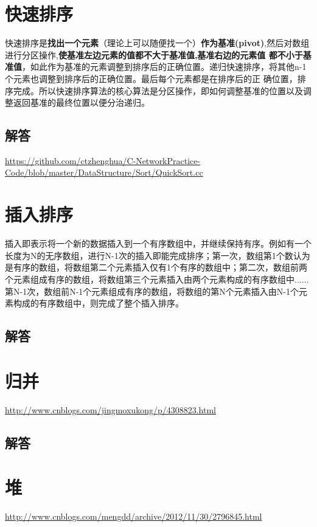 \documentclass[UTF8,a4paper,12pt]{ctexbook}
\begin{document}
\section{快速排序}

	快速排序是\textbf{找出一个元素}（理论上可以随便找一个）\textbf{作为基准(pivot)},然后对数组进行分区操作,\textbf{使基准左边元素的值都不大于基准值,基准右边的元素值 都不小于基准值}，如此作为基准的元素调整到排序后的正确位置。递归快速排序，将其他n-1个元素也调整到排序后的正确位置。最后每个元素都是在排序后的正 确位置，排序完成。所以快速排序算法的核心算法是分区操作，即如何调整基准的位置以及调整返回基准的最终位置以便分治递归。
	
	\subsection{解答}
		\url{https://github.com/ctzhenghua/C-NetworkPractice-Code/blob/master/DataStructure/Sort/QuickSort.cc}
\section{插入排序}
	
	插入即表示将一个新的数据插入到一个有序数组中，并继续保持有序。例如有一个长度为N的无序数组，进行N-1次的插入即能完成排序；第一次，数组第1个数认为是有序的数组，将数组第二个元素插入仅有1个有序的数组中；第二次，数组前两个元素组成有序的数组，将数组第三个元素插入由两个元素构成的有序数组中......第N-1次，数组前N-1个元素组成有序的数组，将数组的第N个元素插入由N-1个元素构成的有序数组中，则完成了整个插入排序。
	
	\subsection{解答}
	
\section{归并}
	
	\url{http://www.cnblogs.com/jingmoxukong/p/4308823.html}
	
	\subsection{解答}
	
\section{堆}
	\url{http://www.cnblogs.com/mengdd/archive/2012/11/30/2796845.html}
	
\end{document}

